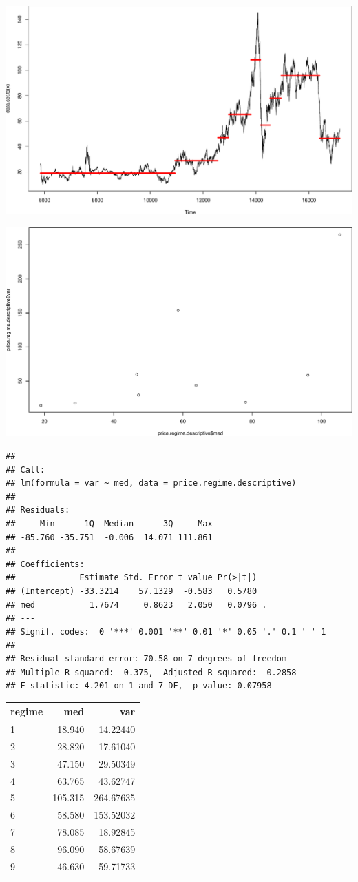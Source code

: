 \documentclass[11pt,]{article}
\makeatletter
\def\maxwidth{\ifdim\Gin@nat@width>\linewidth\linewidth
\else\Gin@nat@width\fi}
\let\Oldincludegraphics\includegraphics
\renewcommand{\includegraphics}[1]{\Oldincludegraphics[width=\maxwidth]{#1}}
\makeatother
\begin{document}
\includegraphics{Figs/unnamed-chunk-11-1.pdf}

\includegraphics{Figs/unnamed-chunk-13-1.pdf}

\begin{verbatim}
## 
## Call:
## lm(formula = var ~ med, data = price.regime.descriptive)
## 
## Residuals:
##     Min      1Q  Median      3Q     Max 
## -85.760 -35.751  -0.006  14.071 111.861 
## 
## Coefficients:
##             Estimate Std. Error t value Pr(>|t|)  
## (Intercept) -33.3214    57.1329  -0.583   0.5780  
## med           1.7674     0.8623   2.050   0.0796 .
## ---
## Signif. codes:  0 '***' 0.001 '**' 0.01 '*' 0.05 '.' 0.1 ' ' 1
## 
## Residual standard error: 70.58 on 7 degrees of freedom
## Multiple R-squared:  0.375,  Adjusted R-squared:  0.2858 
## F-statistic: 4.201 on 1 and 7 DF,  p-value: 0.07958
\end{verbatim}

\begin{longtable}[]{@{}lrr@{}}
\toprule
regime & med & var\tabularnewline
\midrule
\endhead
1 & 18.940 & 14.22440\tabularnewline
2 & 28.820 & 17.61040\tabularnewline
3 & 47.150 & 29.50349\tabularnewline
4 & 63.765 & 43.62747\tabularnewline
5 & 105.315 & 264.67635\tabularnewline
6 & 58.580 & 153.52032\tabularnewline
7 & 78.085 & 18.92845\tabularnewline
8 & 96.090 & 58.67639\tabularnewline
9 & 46.630 & 59.71733\tabularnewline
\bottomrule
\end{longtable}
\newpage
\singlespacing

\end{document}
